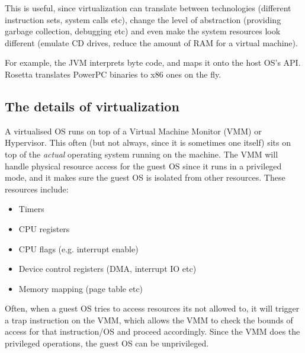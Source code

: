 This is useful, since virtualization can translate between technologies
(different instruction sets, system calls etc), change the level of abstraction
(providing garbage collection, debugging etc) and even make the system resources
look different (emulate CD drives, reduce the amount of RAM for a virtual
machine).


For example, the JVM interprets byte code, and maps it onto the host OS's API.
Rosetta translates PowerPC binaries to x86 ones on the fly.

\subsection{The details of virtualization}

A virtualised OS runs on top of a Virtual Machine Monitor (VMM) or Hypervisor.
This often (but not always, since it is sometimes one itself) sits on top of the
\textit{actual} operating system running on the machine. The VMM will handle
physical resource access for the guest OS since it runs in a privileged mode,
and it makes sure the guest OS is isolated from other resources. These resources
include:

\begin{mymulticols}
  \begin{itemize}
    \item Timers
    \item CPU registers
    \item CPU flags (e.g. interrupt enable)
    \item Device control registers (DMA, interrupt IO etc)
    \item Memory mapping (page table etc)
  \end{itemize}
\end{mymulticols}

Often, when a guest OS tries to access resources its not allowed to, it will
trigger a trap instruction on the VMM, which allows the VMM to check the bounds
of access for that instruction/OS and proceed accordingly. Since the VMM does
the privileged operations, the guest OS can be unprivileged.

